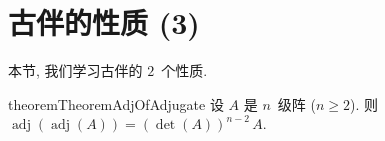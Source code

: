 \documentclass[../libro.tex]{subfiles}
\begin{document}


\section{古伴的性质 (3)}

本节, 我们学习古伴的 \(2\)~个性质.

\begin{restatable}{theorem}{TheoremAdjOfAdjugate}
    设 \(A\) 是 \(n\)~级阵 (\(n \geq 2\)).
    则
    \(\operatorname{adj} {(\operatorname{adj} {(A)})}
    = (\det {(A)})^{n-2}\,A\).
\end{restatable}
\end{document}

